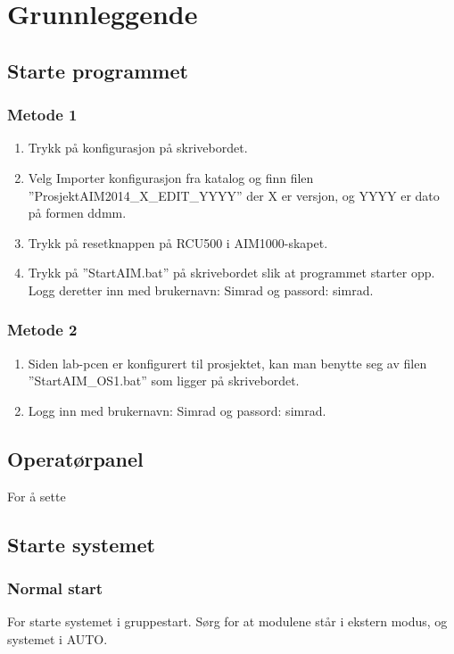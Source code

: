 \section{Grunnleggende}
\subsection{Starte programmet}
\subsubsection*{Metode 1}
\begin{enumerate}
	\item Trykk på konfigurasjon på skrivebordet.
  \item Velg Importer konfigurasjon fra katalog og finn filen ''ProsjektAIM2014\_X\_EDIT\_YYYY'' der X er versjon, og YYYY er dato på formen ddmm.
  \item Trykk på resetknappen på RCU500 i AIM1000-skapet.
	\item Trykk på ''StartAIM.bat'' på skrivebordet slik at programmet starter opp. Logg deretter inn med brukernavn: Simrad og passord: simrad. 
\end{enumerate}

\subsubsection*{Metode 2}
\begin{enumerate}
  \item Siden lab-pcen er konfigurert til prosjektet, kan man benytte seg av filen ''StartAIM\_OS1.bat'' som ligger på skrivebordet.
  \item Logg inn med brukernavn: Simrad og passord: simrad.
\end{enumerate}

\subsection{Operatørpanel}
For å sette 

\subsection{Starte systemet}
\subsubsection*{Normal start}
For starte systemet i gruppestart. Sørg for at modulene står i ekstern modus, og systemet i AUTO. 
